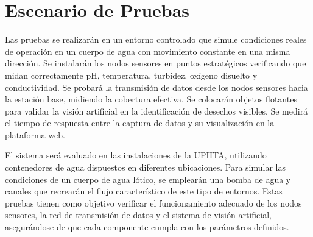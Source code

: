\section{Escenario de Pruebas}

Las pruebas se realizarán en un entorno controlado que simule condiciones reales de operación en un cuerpo de agua con movimiento constante en una misma dirección. 
Se instalarán los nodos sensores en puntos estratégicos verificando que midan correctamente pH, temperatura, turbidez, oxígeno disuelto y conductividad.
Se probará la transmisión de datos desde los nodos sensores hacia la estación base, midiendo la cobertura efectiva. Se colocarán objetos flotantes para validar la visión artificial en la identificación de desechos visibles. Se medirá el tiempo de respuesta entre la captura de datos y su visualización en la plataforma web.
 



El sistema será evaluado en las instalaciones de la UPIITA, utilizando contenedores de agua dispuestos en diferentes ubicaciones. Para simular las condiciones de un cuerpo de agua lótico, se emplearán una bomba de agua y canales que recrearán el flujo característico de este tipo de entornos. Estas pruebas tienen como objetivo verificar el funcionamiento adecuado de los nodos sensores, la red de transmisión de datos y el sistema de visión artificial, asegurándose de que cada componente cumpla con los parámetros definidos.


